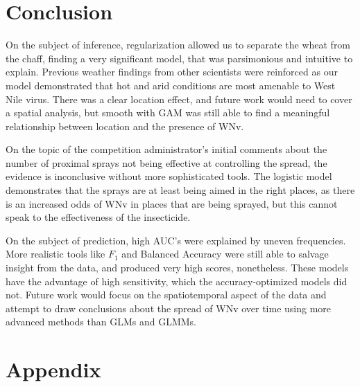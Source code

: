 \documentclass[12pt]{article}
\begin{document}
\section{Conclusion}
On the subject of inference, regularization allowed us to separate the wheat from the chaff, finding a very significant model, that was parsimonious and intuitive to explain. Previous weather findings from other scientists were reinforced as our model demonstrated that hot and arid conditions are most amenable to West Nile virus. There was a clear location effect, and future work would need to cover a spatial analysis, but smooth with GAM was still able to find a meaningful relationship between location and the presence of WNv.

On the topic of the competition administrator's initial comments about the number of proximal sprays not being effective at controlling the spread, the evidence is inconclusive without more sophisticated tools. The logistic model demonstrates that the sprays are at least being aimed in the right places, as there is an increased odds of WNv in places that are being sprayed, but this cannot speak to the effectiveness of the insecticide.

On the subject of prediction, high AUC's were explained by uneven frequencies. More realistic tools like $F_1$ and Balanced Accuracy were still able to salvage insight from the data, and produced very high scores, nonetheless. These models have the advantage of high sensitivity, which the accuracy-optimized models did not. Future work would focus on the spatiotemporal aspect of the data and attempt to draw conclusions about the spread of WNv over time using more advanced methods than GLMs and GLMMs.

\newpage
\section{Appendix}
\end{document}

